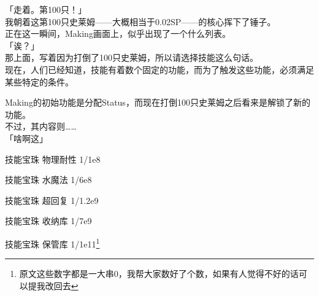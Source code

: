 「走着。第100只！」\\

我朝着这第100只史莱姆——大概相当于0.02SP——的核心挥下了锤子。\\

正在这一瞬间，Making画面上，似乎出现了一个什么列表。\\

「诶？」\\

那上面，写着因为打倒了100只史莱姆，所以请选择技能这么句话。\\

现在，人们已经知道，技能有着数个固定的功能，而为了触发这些功能，必须满足某些特定的条件。

Making的初始功能是分配Status，而现在打倒100只史莱姆之后看来是解锁了新的功能。\\

不过，其内容则……\\

「啥啊这」\\

\cardline

  技能宝珠	物理耐性		1/1e8

  技能宝珠	水魔法		1/6e8

  技能宝珠	超回复		1/1.2e9

  技能宝珠	收纳库		1/7e9

  技能宝珠	保管库		1/1e11\footnote{原文这些数字都是一大串0，我帮大家数好了个数，如果有人觉得不好的话可以提我改回去}

